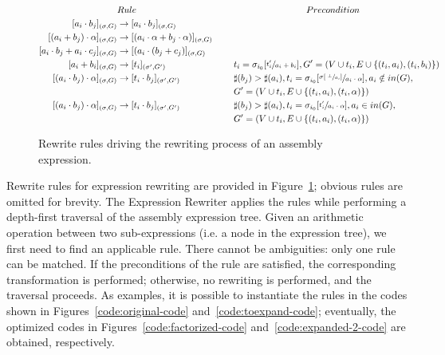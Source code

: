 \begin{figure}[t]
\scriptsize
\centering
\begin{spacing}{1.35}
\begin{align*}
~~~~~~&Rule &~~&~~~~~~~~~~~~~~~~~~~~~~~~Precondition \\
[a_i \cdot b_j]_{(\sigma, G)} &\rightarrow [a_i \cdot b_j]_{(\sigma, G)} ~~&~~&\\
[(a_i + b_j)\cdot \alpha]_{(\sigma, G)} &\rightarrow [(a_i \cdot \alpha + b_j \cdot \alpha)]_{(\sigma, G)} ~~&~~ &\\
[a_i \cdot b_j + a_i \cdot c_j]_{(\sigma, G)} &\rightarrow [(a_i \cdot (b_j + c_j)]_{(\sigma, G)} ~~&~~ &\\
[a_i + b_i]_{(\sigma, G)} &\rightarrow [t_i]_{(\sigma', G')} ~~&~~ &t_i = \sigma_{i_0}[\sfrac{t_i'}{a_i + b_i}], G' = (V \cup {t_i}, E \cup \lbrace(t_i, a_i), (t_i, b_i)\rbrace)\\
[(a_i \cdot b_j) \cdot \alpha]_{(\sigma, G)} &\rightarrow [t_i \cdot b_j]_{(\sigma', G')} ~~&~~ &\sharp(b_j) > \sharp(a_i), t_i = \sigma_{i_0}[\sfrac{\sigma[\sfrac{\perp}{a_i}]}{a_i \cdot \alpha}], a_i \notin in(G), \\
~&~~&~~&G' = (V \cup {t_i}, E \cup \lbrace(t_i, a_i), (t_i, \alpha)\rbrace)\\
[(a_i \cdot b_j) \cdot \alpha]_{(\sigma, G)} &\rightarrow [t_i \cdot b_j]_{(\sigma', G')} ~~&~~ &\sharp(b_j) > \sharp(a_i), t_i = \sigma_{i_0}[\sfrac{t_i'}{a_i \cdot \alpha}], a_i \in in(G), \\
~&~~&~~&G' = (V \cup {t_i}, E \cup \lbrace(t_i, a_i), (t_i, \alpha)\rbrace)\\
\end{align*}
\end{spacing}
\caption{Rewrite rules driving the rewriting process of an assembly expression.}\label{fig:rewrite-rules}
\end{figure}

Rewrite rules for expression rewriting are provided in Figure~\ref{fig:rewrite-rules}; obvious rules are omitted for brevity. The Expression Rewriter applies the rules while performing a depth-first traversal of the assembly expression tree. Given an arithmetic operation between two sub-expressions (i.e. a node in the expression tree), we first need to find an applicable rule. There cannot be ambiguities: only one rule can be matched. If the preconditions of the rule are satisfied, the corresponding transformation is performed; otherwise, no rewriting is performed, and the traversal proceeds. As examples, it is possible to instantiate the rules in the codes shown in Figures~\ref{code:original-code} and~\ref{code:toexpand-code}; eventually, the optimized codes in Figures~\ref{code:factorized-code} and~\ref{code:expanded-2-code} are obtained, respectively. 

